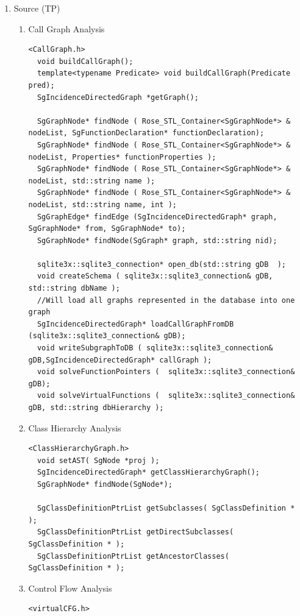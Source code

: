 \begin{enumerate}
   \item Source (TP) \\
   \begin{enumerate}
      \item Call Graph Analysis
      \begin{lstlisting}
<CallGraph.h>
  void buildCallGraph();
  template<typename Predicate> void buildCallGraph(Predicate pred);
  SgIncidenceDirectedGraph *getGraph(); 

  SgGraphNode* findNode ( Rose_STL_Container<SgGraphNode*> & nodeList, SgFunctionDeclaration* functionDeclaration);
  SgGraphNode* findNode ( Rose_STL_Container<SgGraphNode*> & nodeList, Properties* functionProperties );
  SgGraphNode* findNode ( Rose_STL_Container<SgGraphNode*> & nodeList, std::string name );
  SgGraphNode* findNode ( Rose_STL_Container<SgGraphNode*> & nodeList, std::string name, int );
  SgGraphEdge* findEdge (SgIncidenceDirectedGraph* graph, SgGraphNode* from, SgGraphNode* to);
  SgGraphNode* findNode(SgGraph* graph, std::string nid);

  sqlite3x::sqlite3_connection* open_db(std::string gDB  );
  void createSchema ( sqlite3x::sqlite3_connection& gDB, std::string dbName );
  //Will load all graphs represented in the database into one graph
  SgIncidenceDirectedGraph* loadCallGraphFromDB (sqlite3x::sqlite3_connection& gDB);
  void writeSubgraphToDB ( sqlite3x::sqlite3_connection& gDB,SgIncidenceDirectedGraph* callGraph );
  void solveFunctionPointers (  sqlite3x::sqlite3_connection& gDB);
  void solveVirtualFunctions (  sqlite3x::sqlite3_connection& gDB, std::string dbHierarchy );

      \end{lstlisting}

      \item Class Hierarchy Analysis
      \begin{lstlisting}
<ClassHierarchyGraph.h>
  void setAST( SgNode *proj );
  SgIncidenceDirectedGraph* getClassHierarchyGraph();
  SgGraphNode* findNode(SgNode*);
  
  SgClassDefinitionPtrList getSubclasses( SgClassDefinition * );
  SgClassDefinitionPtrList getDirectSubclasses( SgClassDefinition * );
  SgClassDefinitionPtrList getAncestorClasses( SgClassDefinition * );

      \end{lstlisting}

      \item Control Flow Analysis
      \begin{lstlisting}
<virtualCFG.h> 


\end{lstlisting}
\end{enumerate}
\end{enumerate}
